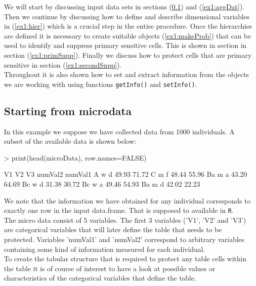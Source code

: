 \documentclass{article}
\begin{document}
We will start by discussing input data sets in sections (\ref{ex1:microDat}) 
and (\ref{ex1:aggDat}). Then we continue by discussing how to define and 
describe dimensional variables in (\ref{ex1:hier}) which is a crucial 
step in the entire procedure. Once the hierarchies are defined it is necessary
to create suitable objects (\ref{ex1:makeProb}) that can be used to identify 
and suppress primary sensitive cells. This is shown in section in section 
(\ref{ex1:primSupp}). Finally we discuss how to protect cells that are primary 
sensitive in section (\ref{ex1:secondSupp}). \\

Throughout it is also shown how to set and extract information from the objects we 
are working with using functions {\tt getInfo()} and {\tt setInfo()}.

\subsection{Starting from microdata}\label{ex1:microDat}
In this example we suppose we have collected data from 1000 
individuals. A subset of the available data is shown below:
\begin{Schunk}
\begin{Sinput}
> print(head(microData), row.names=FALSE)
\end{Sinput}
\begin{Soutput}
 V1 V2 V3 numVal2 numVal1
  A  w  d   49.93   71.72
  C  m  f   48.44   55.96
 Ba  m  a   43.20   64.69
 Bc  w  d   31.38   30.72
 Bc  w  a   49.46   54.93
 Ba  m  d   42.02   22.23
\end{Soutput}
\end{Schunk}
We note that the information we have obtained for any individual corresponds to 
exactly one row in the input data.frame. That is supposed to available in 
{\tt R}. \\

The micro data consist of 5 variables. The first 3 variables
('V1', 'V2' and 'V3') are categorical variables that will later define the table 
that needs to be protected. Variables 'numVal1' and 'numVal2' correspond to 
arbitrary variables containing some kind of information measured for each 
individual. \\

To create the tabular structure that is required to protect any table cells
within the table it is of course of interest to have a look at possible values or
characteristics of the categorical variables that define the table.
\end{document}
